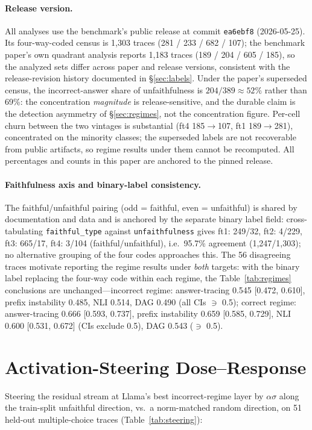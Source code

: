 \documentclass[11pt]{article}
\begin{document}
\paragraph{Release version.} All analyses use the benchmark's public release at commit \texttt{ea6ebf8} (2026-05-25). Its four-way-coded census is 1{,}303 traces (281 / 233 / 682 / 107); the benchmark paper's own quadrant analysis reports 1{,}183 traces (189 / 204 / 605 / 185), so the analyzed sets differ across paper and release versions, consistent with the release-revision history documented in \S\ref{sec:labels}. Under the paper's superseded census, the incorrect-answer share of unfaithfulness is $204/389 \approx 52\%$ rather than 69\%: the concentration \emph{magnitude} is release-sensitive, and the durable claim is the detection asymmetry of \S\ref{sec:regimes}, not the concentration figure. Per-cell churn between the two vintages is substantial (ft4 185$\to$107, ft1 189$\to$281), concentrated on the minority classes; the superseded labels are not recoverable from public artifacts, so regime results under them cannot be recomputed. All percentages and counts in this paper are anchored to the pinned release.

\paragraph{Faithfulness axis and binary-label consistency.} The faithful/unfaithful pairing (odd = faithful, even = unfaithful) is shared by documentation and data and is anchored by the separate binary label field: cross-tabulating \texttt{faithful\_type} against \texttt{unfaithfulness} gives ft1: 249/32, ft2: 4/229, ft3: 665/17, ft4: 3/104 (faithful/unfaithful), i.e.\ 95.7\% agreement (1{,}247/1{,}303); no alternative grouping of the four codes approaches this. The 56 disagreeing traces motivate reporting the regime results under \emph{both} targets: with the binary label replacing the four-way code within each regime, the Table~\ref{tab:regimes} conclusions are unchanged---incorrect regime: answer-tracing 0.545 [0.472, 0.610], prefix instability 0.485, NLI 0.514, DAG 0.490 (all CIs $\ni$ 0.5); correct regime: answer-tracing 0.666 [0.593, 0.737], prefix instability 0.659 [0.585, 0.729], NLI 0.600 [0.531, 0.672] (CIs exclude 0.5), DAG 0.543 ($\ni$ 0.5).

\section{Activation-Steering Dose--Response}
\label{app:steering}
Steering the residual stream at Llama's best incorrect-regime layer by $\alpha\sigma$ along the train-split unfaithful direction, vs.\ a norm-matched random direction, on 51 held-out multiple-choice traces (Table~\ref{tab:steering}):
\end{document}

